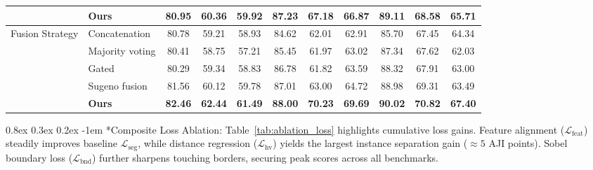 \documentclass{article}
\makeatletter
\renewcommand\paragraph{\@startsection{paragraph}{4}{0pt}%
  {0.8ex \@plus 0.3ex \@minus 0.2ex}%
  {-1em}%
  {\normalsize\bfseries}}
\makeatother
\begin{document}
\begin{table}[htbp]
{\begin{tabular}{|p{2.2cm}|p{1.8cm}|ccc|ccc|ccc|}
& \textbf{Ours}
& \textbf{80.95} & \textbf{60.36} & \textbf{59.92}
& \textbf{87.23} & \textbf{67.18} & \textbf{66.87}
& \textbf{89.11} & \textbf{68.58} & \textbf{65.71}\\

\hline

\multirow{5}{*}{Fusion Strategy}
& Concatenation
& 80.78 & 59.21 & 58.93
& 84.62 & 62.01 & 62.91
& 85.70 & 67.45 & 64.34 \\

& Majority voting
& 80.41 & 58.75 & 57.21
& 85.45 & 61.97 & 63.02
& 87.34 & 67.62 & 62.03 \\

& Gated
& 80.29 & 59.34 & 58.83 
& 86.78 & 61.82 & 63.59
& 88.32 & 67.91 & 63.00 \\

& Sugeno fusion
& 81.56 & 60.12 & 59.78
& 87.01 & 63.00 & 64.72
& 88.98 & 69.31 & 63.49 \\

& \textbf{Ours}
& \textbf{82.46} & \textbf{62.44} & \textbf{61.49}
& \textbf{88.00} & \textbf{70.23} & \textbf{69.69}
& \textbf{90.02} & \textbf{70.82} & \textbf{67.40}\\

\hline

\end{tabular}
}
\end{table}

\paragraph*{Composite Loss Ablation:}
Table~\ref{tab:ablation_loss} highlights cumulative loss gains. Feature alignment ($\mathcal{L}_{\text{feat}}$) steadily improves baseline $\mathcal{L}_{\text{seg}}$, while distance regression ($\mathcal{L}_{\text{hv}}$) yields the largest instance separation gain ($\approx 5$ AJI points). Sobel boundary loss ($\mathcal{L}_{\text{bnd}}$) further sharpens touching borders, securing peak scores across all benchmarks.
\end{document}
